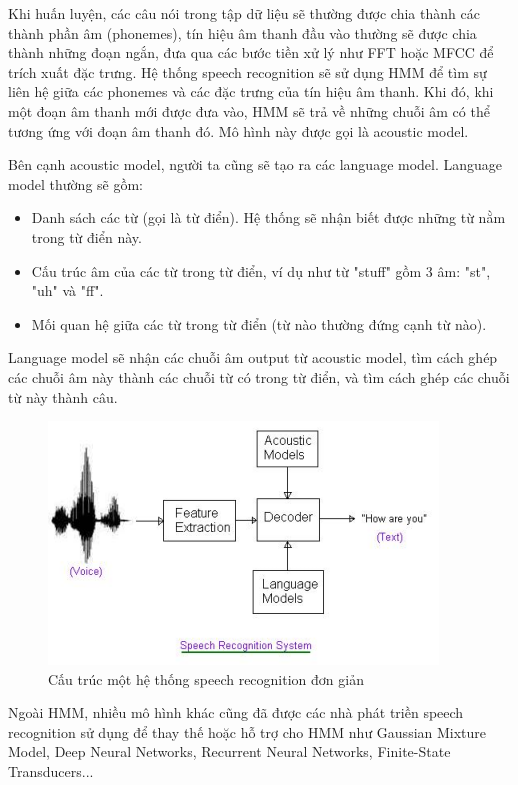 Khi huấn luyện, các câu nói trong tập dữ liệu sẽ thường được chia thành các thành phần âm (phonemes), tín hiệu âm thanh đầu vào thường sẽ được chia thành những đoạn ngắn, đưa qua các bước tiền xử lý như FFT hoặc MFCC để trích xuất đặc trưng. Hệ thống speech recognition sẽ sử dụng HMM để tìm sự liên hệ giữa các phonemes và các đặc trưng của tín hiệu âm thanh. Khi đó, khi một đoạn âm thanh mới được đưa vào, HMM sẽ trả về những chuỗi âm có thể tương ứng với đoạn âm thanh đó. Mô hình này được gọi là acoustic model.

Bên cạnh acoustic model, người ta cũng sẽ tạo ra các language model. Language model thường sẽ gồm:

\begin{itemize}
    \item Danh sách các từ (gọi là từ điển). Hệ thống sẽ nhận biết được những từ nằm trong từ điển này.
    \item Cấu trúc âm của các từ trong từ điển, ví dụ như từ "stuff" gồm 3 âm: "st", "uh" và "ff".
    \item Mối quan hệ giữa các từ trong từ điển (từ nào thường đứng cạnh từ nào).
\end{itemize}

Language model sẽ nhận các chuỗi âm output từ acoustic model, tìm cách ghép các chuỗi âm này thành các chuỗi từ có trong từ điển, và tìm cách ghép các chuỗi từ này thành câu.

\begin{figure}[h]
    \centering
    \includegraphics[scale=1]{SRSystem}
    \caption{Cấu trúc một hệ thống speech recognition đơn giản}
    \label{fig:c3_SRSystem}
\end{figure}

Ngoài HMM, nhiều mô hình khác cũng đã được các nhà phát triền speech recognition sử dụng để thay thế hoặc hỗ trợ cho HMM như Gaussian Mixture Model, Deep Neural Networks, Recurrent Neural Networks, Finite-State Transducers...


